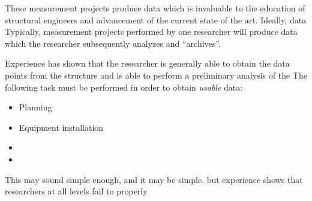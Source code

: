 \documentclass{article}
\begin{document}
These measurement projects produce data which is invaluable to the education of structural engineers and advancement of the current state of the art.  Ideally, data  Typically, measurement projects performed by one researcher will produce data which the researcher subsequently analyzes and ``archives''.

Experience has shown that the researcher is generally able to obtain the data points from the structure and is able to perform a preliminary analysis of the  The following task
must be performed in order to obtain \emph{usable} data:

\begin{itemize}
\item Planning
\item Equipment installation
\item
\item
\end{itemize}

This may sound simple enough, and it may be simple, but experience shows that researchers at all levels fail to properly
\end{document}
